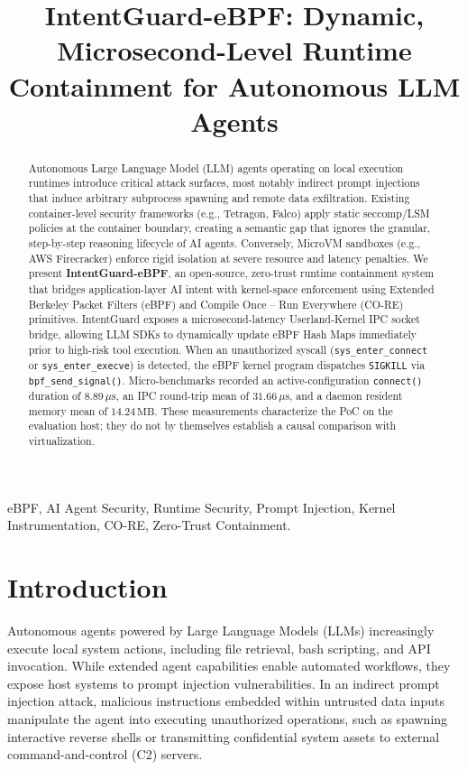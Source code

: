 \documentclass[conference]{IEEEtran}
\begin{document}
\title{IntentGuard-eBPF: Dynamic, Microsecond-Level Runtime Containment for Autonomous LLM Agents}

\author{
}

\maketitle

\begin{abstract}
Autonomous Large Language Model (LLM) agents operating on local execution runtimes introduce critical attack surfaces, most notably indirect prompt injections that induce arbitrary subprocess spawning and remote data exfiltration. Existing container-level security frameworks (e.g., Tetragon, Falco) apply static seccomp/LSM policies at the container boundary, creating a semantic gap that ignores the granular, step-by-step reasoning lifecycle of AI agents. Conversely, MicroVM sandboxes (e.g., AWS Firecracker) enforce rigid isolation at severe resource and latency penalties. We present \textbf{IntentGuard-eBPF}, an open-source, zero-trust runtime containment system that bridges application-layer AI intent with kernel-space enforcement using Extended Berkeley Packet Filters (eBPF) and Compile Once -- Run Everywhere (CO-RE) primitives. IntentGuard exposes a microsecond-latency Userland-Kernel IPC socket bridge, allowing LLM SDKs to dynamically update eBPF Hash Maps immediately prior to high-risk tool execution. When an unauthorized syscall (\texttt{sys\_enter\_connect} or \texttt{sys\_enter\_execve}) is detected, the eBPF kernel program dispatches \texttt{SIGKILL} via \texttt{bpf\_send\_signal()}. Micro-benchmarks recorded an active-configuration \texttt{connect()} duration of $8.89\,\mu\text{s}$, an IPC round-trip mean of $31.66\,\mu\text{s}$, and a daemon resident memory mean of $14.24\,\text{MB}$. These measurements characterize the PoC on the evaluation host; they do not by themselves establish a causal comparison with virtualization.
\end{abstract}

\begin{IEEEkeywords}
eBPF, AI Agent Security, Runtime Security, Prompt Injection, Kernel Instrumentation, CO-RE, Zero-Trust Containment.
\end{IEEEkeywords}

\section{Introduction}
Autonomous agents powered by Large Language Models (LLMs) increasingly execute local system actions, including file retrieval, bash scripting, and API invocation. While extended agent capabilities enable automated workflows, they expose host systems to prompt injection vulnerabilities. In an indirect prompt injection attack, malicious instructions embedded within untrusted data inputs manipulate the agent into executing unauthorized operations, such as spawning interactive reverse shells or transmitting confidential system assets to external command-and-control (C2) servers.
\end{document}
